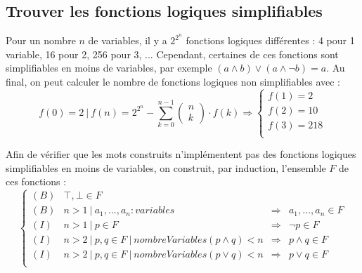 \subsection{Trouver les fonctions logiques simplifiables}
\label{subsec:logic_to_mot/procede/}
\par
Pour un nombre $n$ de variables, il y a $2^{2^n}$ fonctions logiques différentes : 4 pour 1 variable, 16 pour 2, 256 pour 3, ... Cependant, certaines de ces fonctions sont simplifiables en moins de variables, par exemple $(a \wedge b) \vee (a \wedge \neg b) = a$. Au final, on peut calculer le nombre de fonctions logiques non simplifiables avec :
$$f(0)=2~|~f(n)=2^{2^n} - \sum_{k=0}^{n-1}\left(\!\!\!\begin{array}{c}n\\k\end{array}\!\!\!\right) \cdot f(k)\Rightarrow\left\{\begin{array}{l}
f(1)=2\\f(2)=10\\f(3)=218\\
\end{array}\right.$$
\par
Afin de vérifier que les mots construits n'implémentent pas des fonctions logiques simplifiables en moins de variables, on construit, par induction, l'ensemble $F$ de ces fonctions :
$$\left\{
\begin{array}{clcr}
(B) & \top, \bot \in F & & \\
(B) & n > 1 ~|~ a_1, \ldots, a_n : variables& \Rightarrow & a_1, \ldots, a_n \in F\\
(I) & n > 1 ~|~ p \in F & \Rightarrow & \neg p \in F\\
(I) & n > 2 ~|~ p, q \in F ~|~ nombreVariables(p \wedge q) < n & \Rightarrow & p \wedge q \in F\\
(I) & n > 2 ~|~ p, q \in F ~|~ nombreVariables(p \vee q) < n& \Rightarrow & p \vee q \in F\\
\end{array}
\right.$$


